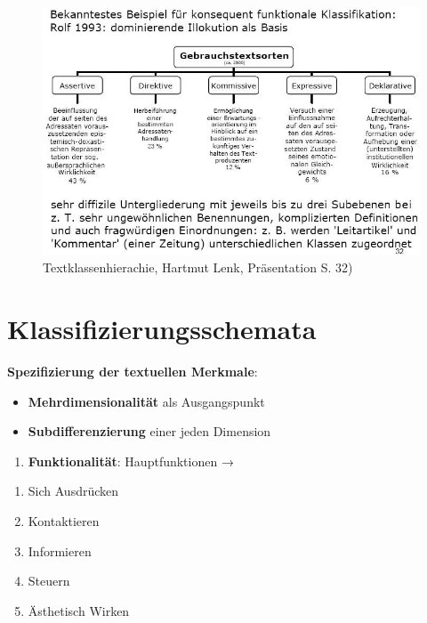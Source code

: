 \documentclass[
  letterpaper,
]{scrbook}
\providecommand{\tightlist}{%
  \setlength{\itemsep}{0pt}\setlength{\parskip}{0pt}}\usepackage{longtable,booktabs,array}
\begin{document}
\begin{figure}

{\centering \includegraphics[width=1\textwidth,height=\textheight]{./pictures/Funktionale_Klassifizierung_Rolf1993.jpg}

}

\caption{Textklassenhierachie, Hartmut Lenk, Präsentation S. 32)}

\end{figure}

\hypertarget{klassifizierungsschemata}{%
\section{Klassifizierungsschemata}\label{klassifizierungsschemata}}

\textbf{Spezifizierung der textuellen Merkmale}:

\begin{itemize}
\item
  \textbf{Mehrdimensionalität} als Ausgangspunkt
\item
  \textbf{Subdifferenzierung} einer jeden Dimension
\end{itemize}

\begin{enumerate}
\def\labelenumi{\arabic{enumi}.}
\tightlist
\item
  \textbf{Funktionalität}: Hauptfunktionen →\\
\end{enumerate}

\begin{enumerate}
\def\labelenumi{\alph{enumi})}
\tightlist
\item
  Sich Ausdrücken\\
\item
  Kontaktieren\\
\item
  Informieren\\
\item
  Steuern\\
\item
  Ästhetisch Wirken\\
\end{enumerate}
\end{document}

